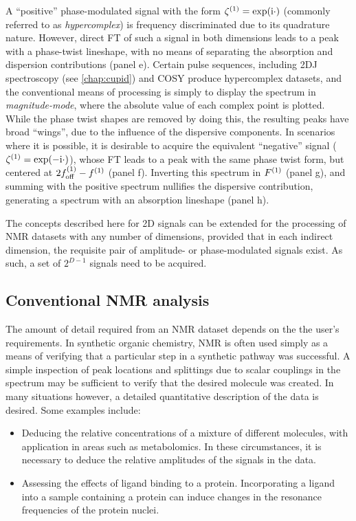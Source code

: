 A ``positive'' phase-modulated signal with the form $\zeta^{(1)} = \exp(\mathrm{i} \cdot)$
(commonly referred to as \emph{hypercomplex}) is frequency discriminated due to
its quadrature nature. However, direct \ac{FT} of such a signal in both
dimensions leads to a peak with a phase-twist lineshape, with no means of
separating the absorption and dispersion contributions (panel e). Certain pulse
sequences, including \ac{2DJ} spectroscopy\cite{Aue1976,Morris2009} (see
\cref{chap:cupid}) and
\ac{COSY}\cite{Jeener1971,Jeener2016,Aue1976a} produce hypercomplex datasets,
and the conventional means of processing is simply to display the
spectrum in \emph{magnitude-mode}, where the absolute value of each complex
point is plotted. While the phase twist shapes are removed by doing this, the
resulting peaks have broad ``wings'', due to the influence of the
dispersive components. In scenarios where it is possible, it is desirable to
acquire the equivalent ``negative'' signal ($\zeta^{(1)} = \exp(-\mathrm{i} \cdot)$),
whose \ac{FT} leads to a peak with the same phase twist form, but centered at
$2f_{\mathrm{off}}^{(1)} - f^{(1)}$ (panel f). Inverting this spectrum in $F^{(1)}$ (panel g),
and summing with the positive spectrum nullifies the dispersive contribution,
generating a spectrum with an absorption lineshape\cite{Davis1992} (panel h).

The concepts described here for \ac{2D} signals can be extended for the
processing of \ac{NMR} datasets with any number of dimensions, provided that in
each indirect dimension, the requisite pair of amplitude- or phase-modulated
signals exist. As such, a set of $2^{D-1}$ signals need to be acquired.

\subsection{Conventional \acs{NMR} analysis}
The amount of detail required from an \ac{NMR} dataset depends on the
the user's requirements. In synthetic organic chemistry, \ac{NMR} is often used
simply as a means of verifying that a particular step in a synthetic pathway
was successful. A simple inspection of peak locations and splittings due to
scalar couplings in the spectrum may be sufficient to verify that the desired
molecule was created. In many situations however, a detailed quantitative
description of the data is desired. Some examples include:
\begin{itemize}
    \item Deducing the relative concentrations of a mixture of different
        molecules, with application in areas such as
        metabolomics\cite{Emwas2019}.
        In these circumstances, it is necessary to deduce the relative
        amplitudes of the signals in the data.
    \item Assessing the effects of ligand binding to a
        protein\cite{Williamson2013}. Incorporating a ligand into a sample
        containing a protein can induce changes in the resonance frequencies of
        the protein nuclei.
\end{itemize}

